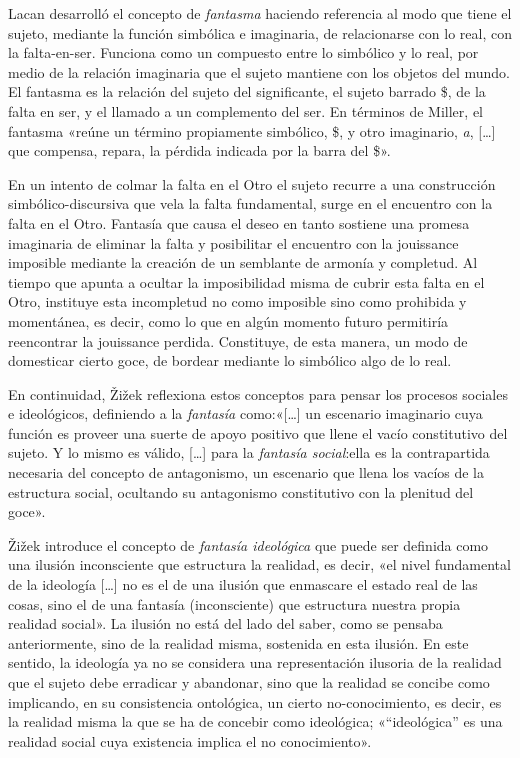 Lacan desarrolló el concepto de \emph{fantasma} haciendo referencia al modo que tiene el sujeto, mediante la función simbólica e imaginaria, de relacionarse con lo real, con la falta-en-ser. Funciona como un compuesto entre lo simbólico y lo real, por medio de la relación imaginaria que el sujeto mantiene con los objetos del mundo. El fantasma es la relación del sujeto del significante, el sujeto barrado \$, de la falta en ser, y el llamado a un complemento del ser. En términos de Miller, el fantasma «reúne un término propiamente simbólico, \$, y otro imaginario, \emph{a}, {[}\ldots{]} que compensa, repara, la pérdida indicada por la barra del \$».

En un intento de colmar la falta en el Otro el sujeto recurre a una construcción simbólico-discursiva que vela la falta fundamental, surge en el encuentro con la falta en el Otro. Fantasía que causa el deseo en tanto sostiene una promesa imaginaria de eliminar la falta y posibilitar el encuentro con la jouissance imposible mediante la creación de un semblante de armonía y completud. Al tiempo que apunta a ocultar la imposibilidad misma de cubrir esta falta en el Otro, instituye esta incompletud no como imposible sino como prohibida y momentánea, es decir, como lo que en algún momento futuro permitiría reencontrar la jouissance perdida. Constituye, de esta manera, un modo de domesticar cierto goce, de bordear mediante lo simbólico algo de lo real.

En continuidad, Žižek reflexiona estos conceptos para pensar los procesos sociales e ideológicos, definiendo a la \emph{fantasía} como:«{[}\ldots{]} un escenario imaginario cuya función es proveer una suerte de apoyo positivo que llene el vacío constitutivo del sujeto. Y lo mismo es válido, {[}\ldots{]} para la \emph{fantasía social}:ella es la contrapartida necesaria del concepto de antagonismo, un escenario que llena los vacíos de la estructura social, ocultando su antagonismo constitutivo con la plenitud del goce».

Žižek introduce el concepto de \emph{fantasía ideológica }que puede ser definida como una ilusión inconsciente que estructura la realidad, es decir, «el nivel fundamental de la ideología {[}\ldots{]} no es el de una ilusión que enmascare el estado real de las cosas, sino el de una fantasía (inconsciente) que estructura nuestra propia realidad social». La ilusión no está del lado del saber, como se pensaba anteriormente, sino de la realidad misma, sostenida en esta ilusión. En este sentido, la ideología ya no se considera una representación ilusoria de la realidad que el sujeto debe erradicar y abandonar, sino que la realidad se concibe como implicando, en su consistencia ontológica, un cierto no-conocimiento, es decir, es la realidad misma la que se ha de concebir como ideológica; «``ideológica'' es una realidad social cuya existencia implica el no conocimiento».

